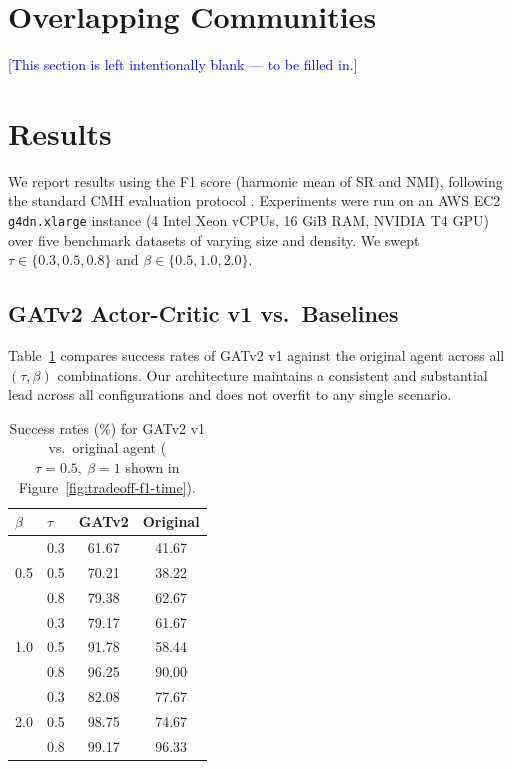 \documentclass[twocolumn,a4paper]{article}
\begin{document}
\section{Overlapping Communities}

\textcolor{blue}{[This section is left intentionally blank — to be filled in.]}


\section{Results}
\label{results}

We report results using the F1 score (harmonic mean of SR and NMI), following
the standard CMH evaluation protocol \parencite{bernini-2024}. Experiments were
run on an AWS EC2 \texttt{g4dn.xlarge} instance (4 Intel Xeon vCPUs, 16 GiB
RAM, NVIDIA T4 GPU) over five benchmark datasets of varying size and density.
We swept $\tau \in \{0.3, 0.5, 0.8\}$ and $\beta \in \{0.5, 1.0, 2.0\}$.

\subsection{GATv2 Actor-Critic v1 vs.\ Baselines}

Table~\ref{tab:success_rate_comparison} compares success rates of GATv2 v1
against the original agent across all $(\tau, \beta)$ combinations. Our
architecture maintains a consistent and substantial lead across all
configurations and does not overfit to any single scenario.

\begin{table}[h]
\centering
\small
\begin{tabular}{llcc}
\toprule
\textbf{$\beta$} & \textbf{$\tau$} & \textbf{GATv2} & \textbf{Original} \\
\midrule
\multirow{3}{*}{0.5} & 0.3 & 61.67 & 41.67 \\
                     & 0.5 & 70.21 & 38.22 \\
                     & 0.8 & 79.38 & 62.67 \\
\midrule
\multirow{3}{*}{1.0} & 0.3 & 79.17 & 61.67 \\
                     & 0.5 & 91.78 & 58.44 \\
                     & 0.8 & 96.25 & 90.00 \\
\midrule
\multirow{3}{*}{2.0} & 0.3 & 82.08 & 77.67 \\
                     & 0.5 & 98.75 & 74.67 \\
                     & 0.8 & 99.17 & 96.33 \\
\bottomrule
\end{tabular}
\caption{Success rates (\%) for GATv2 v1 vs.\ original agent
         ($\tau=0.5,\ \beta=1$ shown in Figure~\ref{fig:tradeoff-f1-time}).}
\label{tab:success_rate_comparison}
\end{table}
\end{document}
